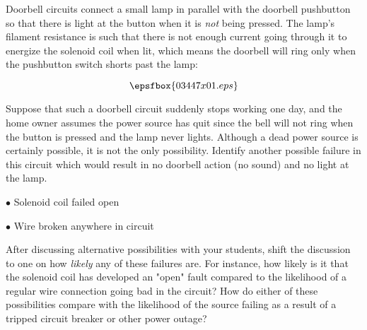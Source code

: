 

Doorbell circuits connect a small lamp in parallel with the doorbell pushbutton so that there is light at the button when it is {\it not} being pressed.  The lamp's filament resistance is such that there is not enough current going through it to energize the solenoid coil when lit, which means the doorbell will ring only when the pushbutton switch shorts past the lamp:

$$\epsfbox{03447x01.eps}$$

Suppose that such a doorbell circuit suddenly stops working one day, and the home owner assumes the power source has quit since the bell will not ring when the button is pressed and the lamp never lights.  Although a dead power source is certainly possible, it is not the only possibility.  Identify another possible failure in this circuit which would result in no doorbell action (no sound) and no light at the lamp.







\medskip
\item{$\bullet$} Solenoid coil failed open
\item{$\bullet$} Wire broken anywhere in circuit
\medskip







After discussing alternative possibilities with your students, shift the discussion to one on how {\it likely} any of these failures are.  For instance, how likely is it that the solenoid coil has developed an "open" fault compared to the likelihood of a regular wire connection going bad in the circuit?  How do either of these possibilities compare with the likelihood of the source failing as a result of a tripped circuit breaker or other power outage?




